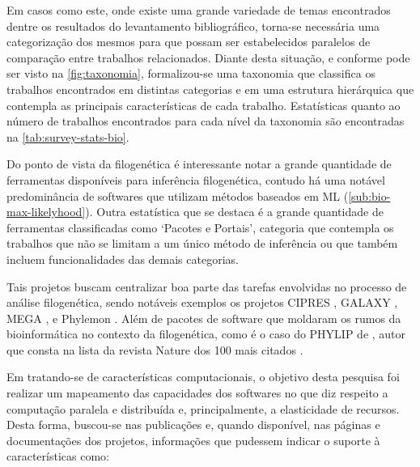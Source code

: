 \documentclass[english,brazilian]{UNISINOSmonografia} %
\begin{document}
Em casos como este, onde existe uma grande variedade de temas encontrados dentre os resultados do levantamento bibliográfico, torna-se necessária uma categorização dos mesmos para que possam ser estabelecidos paralelos de comparação entre trabalhos relacionados.
Diante desta situação, e conforme pode ser visto na \autoref{fig:taxonomia}, formalizou-se uma taxonomia que classifica os trabalhos encontrados em distintas categorias e em uma estrutura hierárquica que contempla as principais características de cada trabalho.
Estatísticas quanto ao número de trabalhos encontrados para cada nível da taxonomia são encontradas na \autoref{tab:survey-stats-bio}.


Do ponto de vista da filogenética é interessante notar a grande quantidade de ferramentas disponíveis para inferência filogenética, contudo há uma notável predominância de softwares que utilizam métodos baseados em ML (\autoref{sub:bio-max-likelyhood}).
Outra estatística que se destaca é a grande quantidade de ferramentas classificadas como `Pacotes e Portais', categoria que contempla os trabalhos que não se limitam a um único método de inferência ou que também incluem funcionalidades das demais categorias.


Tais projetos buscam centralizar boa parte das tarefas envolvidas no processo de análise filogenética, sendo notáveis exemplos os projetos CIPRES \cite{Miller2010}, GALAXY \cite{Afgan2016}, MEGA \cite{Kumar2016}, e Phylemon \cite{Tarraga2007,Sanchez2011}.
Além de pacotes de software que moldaram os rumos da bioinformática no contexto da filogenética, como é o caso do PHYLIP de , autor que consta na lista da revista Nature dos 100 mais citados \cite{NatureTop100}.


Em tratando-se de características computacionais, o objetivo desta pesquisa foi realizar um mapeamento das capacidades dos softwares no que diz respeito a computação paralela e distribuída e, principalmente, a elasticidade de recursos.
Desta forma, buscou-se nas publicações e, quando disponível, nas páginas e documentações dos projetos, informações que pudessem indicar o suporte à características como:
\end{document}
